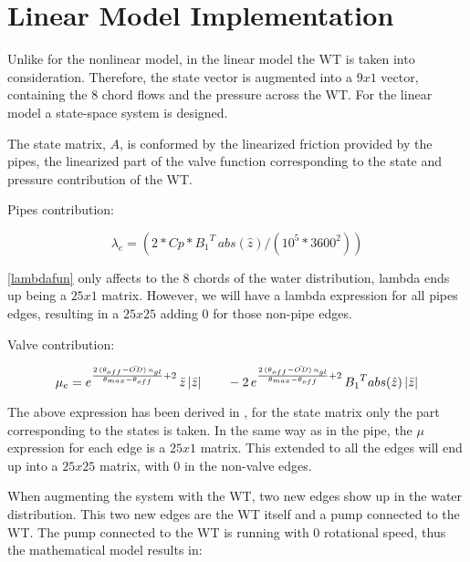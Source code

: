 
\section{Linear Model Implementation}
\label{MatlabScriptLinear}

Unlike for the nonlinear model, in the linear model the WT is taken into consideration. Therefore, the state vector is augmented into a $9x1$ vector, 
containing the 8 chord flows and the pressure across the WT. For the linear model a state-space system is designed.

The state matrix, $A$, is conformed by the linearized friction provided by the pipes, the linearized part of the valve function corresponding to the state and pressure contribution
of the WT.

Pipes contribution:

\begin{equation}
  {\lambda}_e = (2 * Cp * {B_1}^{T} \, abs(\hat{z}) /(10^5*3600^2))
  \label{lambdafun}
\end{equation}

\eqref{lambdafun} only affects to the 8 chords of the water distribution, lambda ends up being a $25x1$ matrix. However, we will have a lambda expression for all pipes
edges, resulting in a $25x25$ adding $0$ for those non-pipe edges. 

Valve contribution:

\vspace{4mm}
\begin{equation}
  {\mu}_e = e^{\frac{2 \, (\theta_{off} - \bar{OD}) \, n_{gl}}{\theta_{max}-\theta_{off}}+2} \, \bar{z} \, |\bar{z}| \quad \quad - \\
  2 \, e^{\frac{2 \, (\theta_{off} - \bar{OD}) \, n_{gl}}{\theta_{max}-\theta_{off}}+2} \, {B_1}^{T} abs(\hat{z}) \, |\bar{z}|
  \label{mufun}
\end{equation}

The above expression has been derived in , for the state matrix only the part corresponding to the states is taken. In the same way 
as in the pipe, the $\mu$ expression for each edge is a $25x1$ matrix. This extended to all the edges will end up into a $25x25$ matrix, with $0$ in the 
non-valve edges. 

When augmenting the system with the WT, two new edges show up in the water distribution. This two new edges are the WT itself and a pump connected to the WT.
The pump connected to the WT is running with $0$ rotational speed, thus the mathematical model results in:

